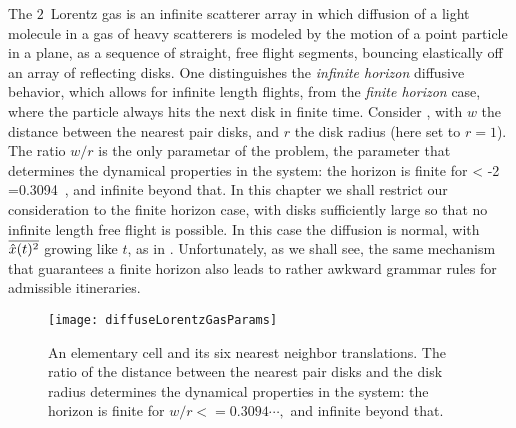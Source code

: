 

The $2$\dmn\ Lorentz gas is an infinite scatterer array in which diffusion of a
light molecule in a gas of heavy scatterers is modeled by the motion of a point
particle in a plane, as a sequence of straight, free flight segments, bouncing
elastically off an array of reflecting disks.
One distinguishes
the {\em infinite horizon} diffusive behavior, which allows for infinite
length flights, from
the {\em finite horizon} case, where the particle always
hits the next disk in finite time.
Consider , with $w$ the distance between the
nearest pair disks, and $r$ the disk radius (here set to $r=1$).
The ratio $w/r$ is the only parametar of the problem, the parameter that
determines the dynamical properties in the system:
the horizon is finite for
\beq
{} < -2 =0.3094\cdots
\,,
and infinite beyond that.
In this chapter we shall restrict our consideration to the finite horizon
case, with disks sufficiently large so that no infinite length free
flight is possible.
In this case the diffusion is
normal, with $\overline{\hat{x}(t)^2}$ growing like $t$,
as in .
Unfortunately, as we shall see,
the same mechanism that guarantees a finite horizon
also leads to rather awkward grammar rules for admissible itineraries.

\begin{figure}[htbp]
	\begin{center}
    \texttt{[image: diffuseLorentzGasParams]}
	\end{center}
	\caption[]{\label{fig-LorentzGasParams}
    An elementary cell and its six nearest neighbor translations. The
    ratio  of the distance between the nearest pair
    disks and the disk radius determines the dynamical properties in the
    system: the horizon is finite for \(w/r<=0.3094\cdots,\) and infinite
    beyond that.
	}
\end{figure}

